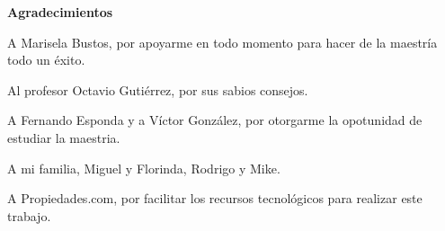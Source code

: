 \begin{center}
{\huge \bfseries Agradecimientos\\}
\end{center}


A Marisela Bustos, por apoyarme en todo momento para hacer de la maestr\'ia todo un \'exito.

Al profesor Octavio Gutiérrez, por sus sabios consejos.

A Fernando Esponda y a V\'ictor Gonz\'alez, por otorgarme la opotunidad de estudiar la maestria.

A mi familia, Miguel y Florinda, Rodrigo y Mike.

A Propiedades.com, por facilitar los recursos tecnol\'ogicos para realizar este trabajo.

